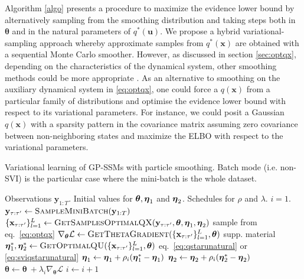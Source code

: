 \documentclass{article} %
\newcommand{\n}[1]{\mathbf{#1}}
\newcommand{\x}{\mathbf{x}}
\newcommand{\y}{\mathbf{y}}
\newcommand{\btheta}{\boldsymbol\theta}
\begin{document}
Algorithm \ref{algo} presents a procedure to maximize the evidence lower bound by alternatively sampling from the smoothing distribution and taking steps both in $\btheta$ and in the natural parameters of $q^*(\n{u})$. We propose a hybrid variational-sampling approach whereby approximate samples from $q^*(\x)$ are obtained with a sequential Monte Carlo smoother. However, as discussed in section \ref{sec:optqx}, depending on the characteristics of the dynamical system, other smoothing methods could be more appropriate \citep{Sarkka2013}. As an alternative to smoothing on the auxiliary dynamical system in \eqref{eq:optqx}, one could force a $q(\x)$ from a particular family of distributions and optimise the evidence lower bound with respect to its variational parameters. For instance, we could posit a Gaussian $q(\x)$ with a sparsity pattern in the covariance matrix assuming zero covariance between non-neighboring states and maximize the ELBO with respect to the variational parameters.

\begin{algorithm}[t]
\caption{Variational learning of GP-SSMs with particle smoothing. Batch mode (i.e. non-SVI) is the particular case where the mini-batch is the whole dataset.}
\label{algo}
\begin{algorithmic}
\REQUIRE Observations $\y_{1:T}$. Initial values for $\btheta, \boeta_1$ and $\boldsymbol{\eta}_2$. Schedules for $\rho$ and $\lambda$. $i=1$.
\REPEAT
\STATE $\y_{\tau:\tau'} \leftarrow \textsc{SampleMiniBatch}(\y_{1:T})$
\STATE $\{\x_{\tau:\tau'}\}_{l=1}^L \leftarrow \textsc{GetSamplesOptimalQX}(\y_{\tau:\tau'},\btheta, \boeta_1, \boeta_2)$ \hfill sample from eq.~\eqref{eq:optqx}
\STATE $\nabla_{\btheta}\mathcal{L} \leftarrow \textsc{GetThetaGradient}(\{\x_{\tau:\tau'}\}_{l=1}^L,\btheta)$ \hfill supp. material
\STATE $\boeta_1^*, \boeta_2^* \leftarrow \textsc{GetOptimalQU}(\{\x_{\tau:\tau'}\}_{l=1}^L,\btheta)$ \hfill eq.~\eqref{eq:qstarunatural} or \eqref{eq:sviqstarunatural}
\STATE $\boldsymbol{\eta}_1 \leftarrow \boldsymbol{\eta}_1 + \rho_i (\boldsymbol{\eta}_1^* - \boldsymbol{\eta}_1)$
\STATE $\boldsymbol{\eta}_2 \leftarrow \boldsymbol{\eta}_2 + \rho_i (\boldsymbol{\eta}_2^* - \boldsymbol{\eta}_2)$
\STATE\hspace{0.9mm} $\btheta \leftarrow  \btheta \ + \lambda_i \nabla_{\btheta}\mathcal{L}$
\STATE\hspace{1.9mm} $i \leftarrow i+1$
\end{algorithmic}
\end{algorithm}
\end{document}
